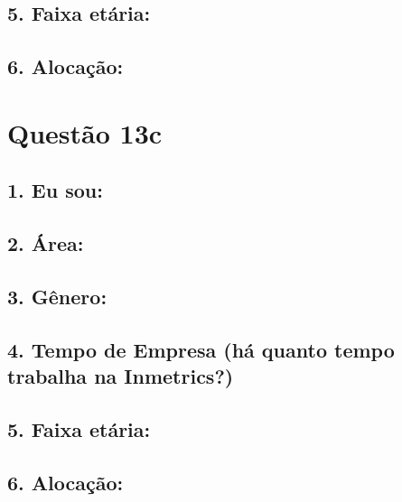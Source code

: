 \documentclass[]{book}
\begin{document}
\hypertarget{faixa-etaria-18}{%
\subsection{5. Faixa etária:}\label{faixa-etaria-18}}

\hypertarget{alocacao-18}{%
\subsection{6. Alocação:}\label{alocacao-18}}

\hypertarget{questao-13c}{%
\section{Questão 13c}\label{questao-13c}}

\hypertarget{eu-sou-19}{%
\subsection{1. Eu sou:}\label{eu-sou-19}}

\hypertarget{area-19}{%
\subsection{2. Área:}\label{area-19}}

\hypertarget{genero-19}{%
\subsection{3. Gênero:}\label{genero-19}}

\hypertarget{tempo-de-empresa-ha-quanto-tempo-trabalha-na-inmetrics-19}{%
\subsection{4. Tempo de Empresa (há quanto tempo trabalha na Inmetrics?)}\label{tempo-de-empresa-ha-quanto-tempo-trabalha-na-inmetrics-19}}

\hypertarget{faixa-etaria-19}{%
\subsection{5. Faixa etária:}\label{faixa-etaria-19}}

\hypertarget{alocacao-19}{%
\subsection{6. Alocação:}\label{alocacao-19}}
\end{document}
